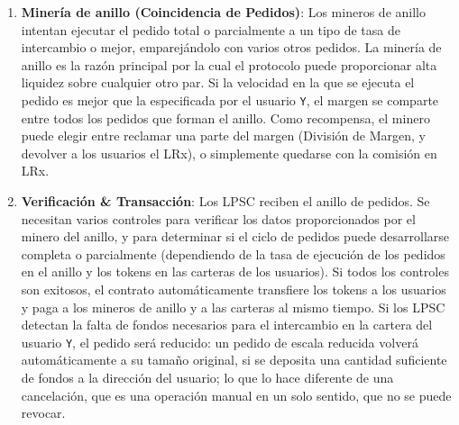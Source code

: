 \documentclass[UTF8,nofonts]{article}
\makeatletter
\newenvironment{figurehere}
 {\def\@captype{figure}}
 {}
\makeatother
\begin{document}
\begin{multicols}{2}
\begin{enumerate}
\begin{center}
\begin{figurehere}

\caption{Proceso de Intercambio EN Loopring}
\label{fig:process}
\end{figurehere}
\end{center}

\item \textbf{Miner\'ia de anillo (Coincidencia de Pedidos)}:  Los mineros de anillo intentan ejecutar el pedido total o parcialmente a un tipo de tasa de intercambio o mejor, emparej\'andolo con varios otros pedidos. La miner\'ia de anillo es la raz\'on principal por la cual el protocolo puede proporcionar alta liquidez sobre cualquier otro par. Si la velocidad en la que se ejecuta el pedido es mejor que la especificada por el usuario \verb|Y|, el margen se comparte entre todos los pedidos que forman el anillo. Como recompensa, el minero puede elegir entre reclamar una parte del margen (Divisi\'on de Margen, y devolver a los usuarios el LRx), o simplemente quedarse con la comisi\'on en LRx.


\item \textbf{Verificaci\'on \& Transacci\'on}: Los LPSC reciben el anillo de pedidos. Se necesitan varios controles para verificar los datos proporcionados por el minero del anillo, y para determinar si el ciclo de pedidos puede desarrollarse completa o parcialmente (dependiendo de la tasa de ejecuci\'on de los pedidos en el anillo y los tokens en las carteras de los usuarios). Si todos los controles son exitosos, el contrato autom\'aticamente transfiere los tokens a los usuarios y paga a los mineros de anillo y a las carteras al mismo tiempo. Si los LPSC detectan la falta de fondos necesarios para el intercambio en la cartera del usuario \verb|Y|, el pedido ser\'a reducido: un pedido de escala reducida volver\'a autom\'aticamente a su tama\~no original, si se deposita una cantidad suficiente de fondos a la direcci\'on del usuario; lo que lo hace diferente de una cancelaci\'on, que es una operaci\'on manual en un solo sentido, que no se puede revocar.

\end{enumerate}





%
%
%



\end{multicols}
\end{document}
